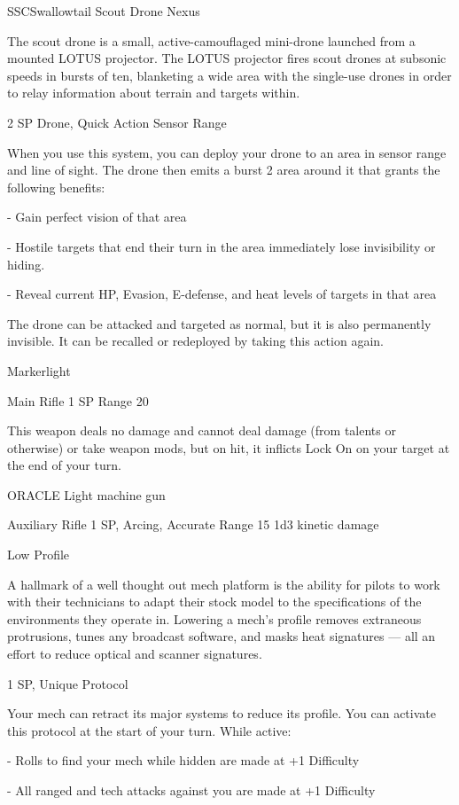 \begin{mech}{SSC}{Swallowtail}
Scout Drone Nexus

The scout drone is a small, active-camouflaged mini-drone launched from a mounted LOTUS projector. The LOTUS projector fires scout drones at subsonic speeds in bursts of ten, blanketing a wide area with the single-use drones in order to relay information about terrain and targets within.

2 SP
Drone, Quick Action
Sensor Range

When you use this system, you can deploy your drone to an area in sensor range and line of sight. The drone then emits a burst 2 area around it that grants the following benefits:

  - Gain perfect vision of that area

  - Hostile targets that end their turn in the area immediately lose invisibility or hiding.

  - Reveal current HP, Evasion, E-defense, and heat levels of targets in that area

The drone can be attacked and targeted as normal, but it is also permanently invisible. It can be recalled or redeployed by taking this action again.


Markerlight

Main Rifle
1 SP
Range 20

This weapon deals no damage and cannot deal damage (from talents or otherwise) or take weapon mods, but on hit, it inflicts Lock On on your target at the end of your turn.


ORACLE Light machine gun

Auxiliary Rifle
1 SP, Arcing, Accurate
Range 15
1d3 kinetic damage


Low Profile

A hallmark of a well thought out mech platform is the ability for pilots to work with their technicians to adapt their stock model to the specifications of the environments they operate in. Lowering a mech’s profile removes extraneous protrusions, tunes any broadcast software, and masks heat signatures — all an effort to reduce optical and scanner signatures.

1 SP, Unique
Protocol

Your mech can retract its major systems to reduce its profile. You can activate this protocol at the start of your turn. While active:

     -   Rolls to find your mech while hidden are made at +1 Difficulty

     -   All ranged and tech attacks against you are made at +1 Difficulty


\end{mech}
